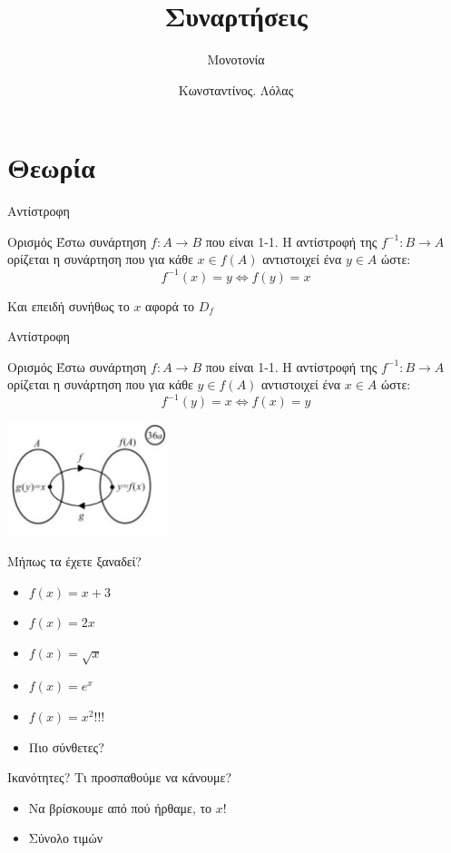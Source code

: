 \documentclass[greek]{beamer}
\title{Συναρτήσεις}
\subtitle{Μονοτονία}
\author[Λόλας]{Κωνσταντίνος. Λόλας}
\date{}
\begin{document}
\begin{frame}
 \titlepage
\end{frame}

\section{Θεωρία}
\begin{frame}{Αντίστροφη}
 \begin{block}{Ορισμός}
  Έστω συνάρτηση  $f:Α\to B$ που είναι 1-1. Η αντίστροφή της $f^{-1}:Β\to Α$ ορίζεται η συνάρτηση που για κάθε $x\in f(Α)$ αντιστοιχεί ένα $y\in Α$ ώστε:
  $$f^{-1}(x)=y \iff f(y)=x$$
 \end{block} \pause
 Και επειδή συνήθως το $x$ αφορά το $D_f$
\end{frame}

\begin{frame}{Αντίστροφη}
 \begin{block}{Ορισμός}
  Έστω συνάρτηση  $f:Α\to B$ που είναι 1-1. Η αντίστροφή της $f^{-1}:Β\to Α$ ορίζεται η συνάρτηση που για κάθε $y\in f(Α)$ αντιστοιχεί ένα $x\in Α$ ώστε:
  $$f^{-1}(y)=x \iff f(x)=y$$
 \end{block}

 \centering
 \includegraphics[width=0.35\textwidth]{"images/1.3.4 Μονοτονία.png"}
\end{frame}

\begin{frame}{Μήπως τα έχετε ξαναδεί?}
 \begin{itemize}
  \item $f(x)=x+3$ \pause
  \item $f(x)=2x$ \pause
  \item $f(x)=\sqrt{x}$ \pause
  \item $f(x)=e^x$ \pause
  \item $f(x)=x^2$!!! \pause
  \item Πιο σύνθετες?
 \end{itemize}
\end{frame}

\begin{frame}{Ικανότητες?}
 Τι προσπαθούμε να κάνουμε? \pause
 \begin{itemize}
  \item Να βρίσκουμε από πού ήρθαμε, το $x$! \pause
  \item Σύνολο τιμών
 \end{itemize}
\end{frame}
\end{document}
